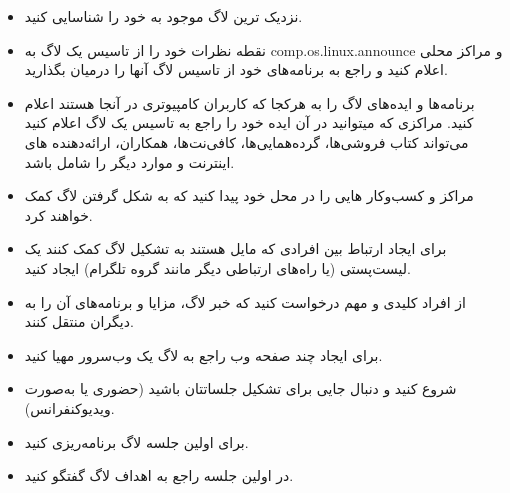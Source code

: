 \begin{itemize}
\item
نزدیک ترین لاگ موجود به خود را شناسایی کنید.
\item
نقطه نظرات خود را از تاسیس یک لاگ به
{\ttfamily comp.os.linux.announce}
و مراکز محلی اعلام کنید و راجع به برنامه‌های خود از تاسیس لاگ آنها را
درمیان بگذارید.
\item
برنامه‌ها و ایده‌های لاگ را به هرکجا که کاربران کامپیوتری در آنجا هستند
اعلام کنید. مراکزی که میتوانید در آن ایده خود را راجع به تاسیس یک لاگ
اعلام کنید می‌تواند کتاب فروشی‌ها، گرده‌همایی‌ها، کافی‌نت‌ها، همکاران، ارائه‌دهنده
های اینترنت و موارد دیگر را شامل باشد.
\item
مراکز و کسب‌وکار هایی را در محل خود پیدا کنید که به شکل گرفتن لاگ کمک
خواهند کرد.
\item
برای ایجاد ارتباط بین افرادی که مایل هستند به تشکیل لاگ کمک کنند یک
لیست‌پستی (یا راه‌های ارتباطی دیگر مانند گروه تلگرام) ایجاد کنید.
\item
از افراد کلیدی و مهم درخواست کنید که خبر لاگ، مزایا و برنامه‌های آن
را به دیگران منتقل کنند.
\item
برای ایجاد چند صفحه وب راجع به لاگ یک وب‌سرور مهیا کنید.

\item
شروع کنید و دنبال جایی برای تشکیل جلساتتان باشید (حضوری یا به‌صورت
ویدیوکنفرانس).
\item
برای اولین جلسه لاگ برنامه‌ریزی کنید.
\item
در اولین جلسه راجع به اهداف لاگ گفتگو کنید.
\end{itemize}

